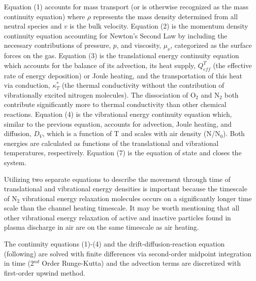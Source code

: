 \documentclass[]{article}
\begin{document}
	
	Equation (1) accounts for mass transport (or is otherwise recognized as the mass continuity equation) where $\rho$ represents the mass density determined from all neutral species and $v$ is the bulk velocity. Equation (2) is the momentum density continuity equation accounting for Newton's Second Law by including the necessary contributions of pressure, $p$, and viscosity, $\mu_{\nu}$, categorized as the surface forces on the gas. Equation (3) is the translational energy continuity equation which accounts for the balance of its advection, its heat supply, $Q_{eff}^T$ (the effective rate of energy deposition) or Joule heating, and the transportation of this heat via conduction, $\kappa^*_T$ (the thermal conductivity without the contribution of vibrationally excited nitrogen molecules). The dissociation of O$_2$ and N$_2$ both contribute significantly more to thermal conductivity than other chemical reactions. Equation (4) is the vibrational energy continuity equation which, similar to the previous equation, accounts for advection, Joule heating, and diffusion, $D_V$, which is a function of T and scales with air density (N/N$_0$). Both energies are calculated as functions of the translational and vibrational temperatures, respectively. Equation (7) is the equation of state and closes the system. 
	
	Utilizing two separate equations to describe the movement through time of translational and vibrational energy densities is important because the timescale of N$_2$ vibrational energy relaxation  molecules occurs on a significantly longer time scale than the channel heating timescale. It may be worth mentioning that all other vibrational energy relaxation of active and inactive particles found in plasma discharge in air are on the same timescale as air heating.  
	
	The continuity equations (1)-(4) and the drift-diffusion-reaction equation (following) are solved with finite differences via second-order midpoint integration in time (2$^{nd}$ Order Runge-Kutta) and the advection terms are discretized with first-order upwind method.
	
\end{document}
